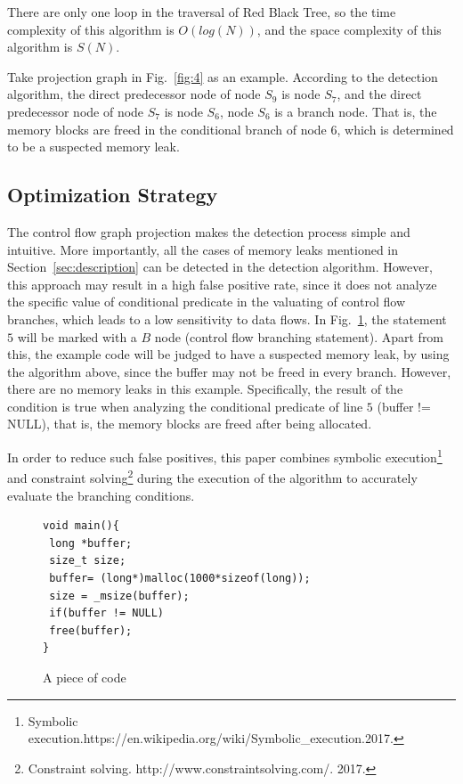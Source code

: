 There are only one loop in the traversal of Red Black Tree, so the time complexity of this algorithm is $O(log(N))$, and the space complexity of this algorithm is $S(N)$.

Take projection graph in Fig.~\ref{fig:4} as an example. According to the detection algorithm, the direct predecessor node of node $S_9$ is node $S_7$, and the direct predecessor node of node $S_7$ is node $S_6$, node $S_6$ is a branch node. That is, the memory blocks are freed in the conditional branch of node $6$, which is determined to be a suspected memory leak.

\subsection{Optimization Strategy}

The control flow graph projection makes the detection process simple and intuitive. More importantly, all the cases of memory leaks mentioned in Section~\ref{sec:description} can be detected in the detection algorithm. However, this approach may result in a high false positive rate, since it does not analyze the specific value of conditional predicate in the valuating of control flow branches, which leads to a low sensitivity to data flows. In Fig.~\ref{fig:7}, the statement $5$ will be marked with a $B$ node (control flow branching statement). Apart from this, the example code will be judged to have a suspected memory leak, by using the algorithm above, since the buffer may not be freed in every branch. However, there are no memory leaks in this example. Specifically, the result of the condition is true when analyzing the conditional predicate of line $5$ (buffer != NULL), that is, the memory blocks are freed after being allocated. 

In order to reduce such false positives, this paper combines symbolic execution\footnote{Symbolic execution.https://en.wikipedia.org/wiki/Symbolic\_execution.2017.} and constraint solving\footnote{Constraint solving. http://www.constraintsolving.com/. 2017.} during the execution of the algorithm to accurately evaluate the branching conditions.
%
\begin{figure}[!h]
\small
\center
\begin{lstlisting}[frame=single,framexrightmargin=-10pt,numbers=right] 
void main(){
 long *buffer;
 size_t size;
 buffer= (long*)malloc(1000*sizeof(long));
 size = _msize(buffer);
 if(buffer != NULL)
 free(buffer);
}
\end{lstlisting}
\caption{A piece of code}\label{fig:7}
\end{figure}

